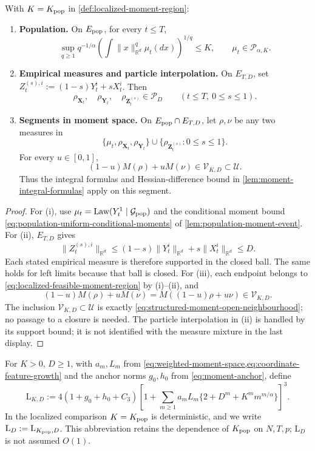 \begin{lemma}
\label{lemma-reachable-moment-tube}
With $K=K_{\rm pop}$ in \cref{def:localized-moment-region}:
\begin{enumerate}[label=(\roman*),leftmargin=*]
\item \textbf{Population.} On $E_{\rm pop}$, for every $t\le T$,
\[
 \sup_{q\ge1}q^{-1/\alpha}
       \left(\int\|x\|_{\mathbb R^d}^q\mu_t(dx)\right)^{1/q}\le K,
 \qquad \mu_t\in\mathcal P_{\alpha,K}.
\]
\item \textbf{Empirical measures and particle interpolation.}
On $E_{T,D}$, set $Z_t^{(s),i}:=(1-s)Y_t^i+sX_t^i$. Then
\[
 \rho_{\mathbf X_t},\quad \rho_{\mathbf Y_t},\quad
 \rho_{\mathbf Z_t^{(s)}}\in\mathcal P_D
 \qquad(t\le T,\ 0\le s\le1).
\]
\item \textbf{Segments in moment space.}
On $E_{\rm pop}\cap E_{T,D}$, let $\rho,\nu$ be any two measures in
\[
 \{\mu_t,\rho_{\mathbf X_t},\rho_{\mathbf Y_t}\}
       \cup\{\rho_{\mathbf Z_t^{(s)}}:0\le s\le1\}.
\]
For every $u\in[0,1]$,
\[
 (1-u)M(\rho)+uM(\nu)
 \in\mathcal V_{K,D}\subset\mathcal U.
\]
Thus the integral formulas and Hessian-difference bound in
\cref{lem:moment-integral-formulas} apply on this segment.
\end{enumerate}
\end{lemma}
\begin{proof}
For (i), use $\mu_t=\operatorname{Law}(Y_t^1\mid\mathcal G_{\rm pop})$
and the conditional moment bound
\eqref{eq:population-uniform-conditional-moments} of
\cref{lem:population-moment-event}.
For (ii), $E_{T,D}$ gives
\[
 \|Z_t^{(s),i}\|_{\mathbb R^d}\le(1-s)\|Y_t^i\|_{\mathbb R^d}+s\|X_t^i\|_{\mathbb R^d}\le D.
\]
Each stated empirical measure is therefore supported in the closed ball.
The same holds for left limits because that ball is closed.
For (iii), each endpoint belongs to \eqref{eq:localized-feasible-moment-region}
by (i)--(ii), and
\[
 (1-u)M(\rho)+uM(\nu)=M((1-u)\rho+u\nu)\in\mathcal V_{K,D}.
\]
The inclusion $\mathcal V_{K,D}\subset\mathcal U$ is exactly
\eqref{eq:structured-moment-open-neighbourhood}; no passage to a
closure is needed.
The particle interpolation in (ii) is handled by its support bound;
it is not identified with the measure mixture in the last display.
\end{proof}

\begin{definition}
\label{def:localized-envelope}
For $K>0$, $D\ge1$, with $a_m,L_m$ from
\cref{eq:weighted-moment-space,eq:coordinate-feature-growth} and the
anchor norms $g_0,h_0$ from \eqref{eq:moment-anchor}, define
\begin{equation}
\label{eq:conditional-comparison-envelope}
 \mathrm L_{K,D}:=4(1+g_0+h_0+C_3)
 \left[1+\sum_{m\ge1}a_mL_m
       \{2+D^m+K^m m^{m/\alpha}\}\right]^3.
\end{equation}
In the localized comparison $K=K_{\rm pop}$ is deterministic, and we write
$\mathrm L_D:=\mathrm L_{K_{\rm pop},D}$. This abbreviation retains the
dependence of $K_{\rm pop}$ on $N,T,p$; $\mathrm L_D$ is not assumed $O(1)$.
\end{definition}

